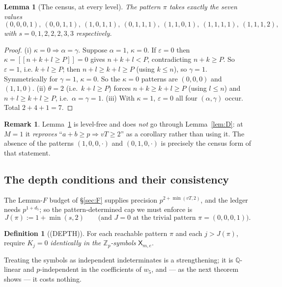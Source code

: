 \documentclass[11pt,reqno]{amsart}
\theoremstyle{plain}
\newtheorem{lemma}[theorem]{Lemma}
\theoremstyle{definition}
\newtheorem{definition}[theorem]{Definition}
\newtheorem{remark}[theorem]{Remark}
\theoremstyle{remark}
\numberwithin{equation}{section}
\newcommand{\ZZ}{\mathbb{Z}}
\newcommand{\QQ}{\mathbb{Q}}
\newcommand{\Zp}{\ZZ_p}
\newcommand{\ii}[1]{[\![#1]\!]}
\newcommand{\wfive}{w_5}
\begin{document}
\begin{lemma}[The census, at every level]\label{lem:census}
The pattern $\pi$ takes exactly the seven values
\[
(0,0,0,1),\ (0,0,1,1),\ (1,0,1,1),\ (0,1,1,1),\ (1,1,0,1),\ (1,1,1,1),\ (1,1,1,2),
\]
with $s=0,1,2,2,2,3,3$ respectively.
\end{lemma}

\begin{proof}
(i) $\kappa=0\Rightarrow\alpha=\gamma$. Suppose $\alpha=1$, $\kappa=0$. If $\varepsilon=0$ then
$\kappa=\ii{n+k+l\ge P}=0$ gives $n+k+l<P$, contradicting $n+k\ge P$. So $\varepsilon=1$, i.e.
$k+l\ge P$; then $n+l\ge k+l\ge P$ (using $k\le n$), so $\gamma=1$. Symmetrically for
$\gamma=1$, $\kappa=0$. So the $\kappa=0$ patterns are $(0,0,0)$ and $(1,1,0)$.
(ii) $\theta=2$ (i.e.\ $k+l\ge P$) forces $n+k\ge k+l\ge P$ (using $l\le n$) and
$n+l\ge k+l\ge P$, i.e.\ $\alpha=\gamma=1$.
(iii) With $\kappa=1$, $\varepsilon=0$ all four $(\alpha,\gamma)$ occur. Total $2+4+1=7$.
\end{proof}

\begin{remark}
Lemma~\ref{lem:census} is level-free and does \emph{not} go through Lemma~\ref{lem:D}: at
$M=1$ it \emph{reproves} ``$a+b\ge p\Rightarrow vT\ge2$'' as a corollary rather than using it.
The absence of the patterns $(1,0,0,\cdot)$ and $(0,1,0,\cdot)$ is precisely the census form of
that statement.
\end{remark}

\subsection{The depth conditions and their consistency}

The Lemma-$F$ budget of \S\ref{sec:F} supplies precision $p^{2+\min(vT,2)}$, and the ledger
needs $p^{1+d_5}$; so the pattern-determined cap we must enforce is
\begin{equation}\label{eq:cap}
J(\pi):=1+\min(s,2)\qquad\text{(and $J=0$ at the trivial pattern $\pi=(0,0,0,1)$)}.
\end{equation}

\begin{definition}[(DEPTH)]\label{def:depth}
For each reachable pattern $\pi$ and each $j>J(\pi)$, require $K_j=0$ \emph{identically in the
$\Zp$-symbols} $\mathsf X_{m,e}$.
\end{definition}

Treating the symbols as independent indeterminates is a strengthening; it is $\QQ$-linear and
$p$-independent in the coefficients of $\wfive$, and --- as the next theorem shows --- it costs
nothing.
\end{document}
